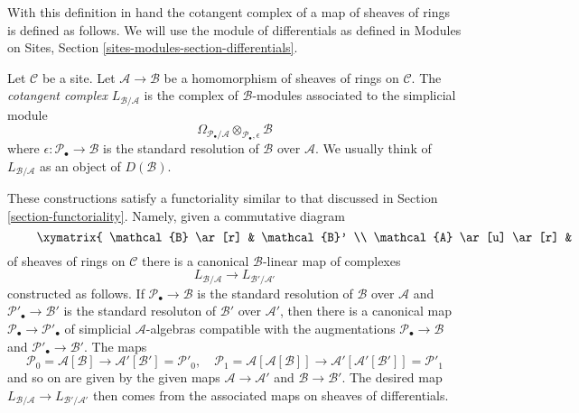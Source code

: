 \noindent
With this definition in hand the cotangent complex of a map of sheaves
of rings is defined as follows.
We will use the module of differentials as defined in
Modules on Sites, Section \ref{sites-modules-section-differentials}.

\begin{definition}
\label{definition-cotangent-complex-morphism-sheaves-rings}
Let $\mathcal{C}$ be a site.
Let $\mathcal{A} \to \mathcal{B}$ be a homomorphism of sheaves of rings
on $\mathcal{C}$.
The {\it cotangent complex} $L_{\mathcal{B}/\mathcal{A}}$
is the complex of $\mathcal{B}$-modules associated to the
simplicial module
$$
\Omega_{\mathcal{P}_\bullet/\mathcal{A}}
\otimes_{\mathcal{P}_\bullet, \epsilon} \mathcal{B}
$$
where $\epsilon : \mathcal{P}_\bullet \to \mathcal{B}$
is the standard resolution of $\mathcal{B}$ over
$\mathcal{A}$. We usually think of $L_{\mathcal{B}/\mathcal{A}}$
as an object of $D(\mathcal{B})$.
\end{definition}

\noindent
These constructions satisfy a functoriality similar to that discussed
in Section \ref{section-functoriality}. Namely, given a commutative diagram
\begin{equation}
\label{equation-commutative-square-sheaves}
\vcenter{
\xymatrix{
\mathcal{B} \ar[r] & \mathcal{B}' \\
\mathcal{A} \ar[u] \ar[r] & \mathcal{A}' \ar[u]
}
}
\end{equation}
of sheaves of rings on $\mathcal{C}$ there is a canonical
$\mathcal{B}$-linear map of complexes
$$
L_{\mathcal{B}/\mathcal{A}} \longrightarrow L_{\mathcal{B}'/\mathcal{A}'}
$$
constructed as follows. If $\mathcal{P}_\bullet \to \mathcal{B}$ is the
standard resolution of $\mathcal{B}$ over $\mathcal{A}$ and
$\mathcal{P}'_\bullet \to \mathcal{B}'$ is the
standard resoluton of $\mathcal{B}'$ over $\mathcal{A}'$,
then there is a canonical map $\mathcal{P}_\bullet \to \mathcal{P}'_\bullet$
of simplicial $\mathcal{A}$-algebras compatible with the augmentations
$\mathcal{P}_\bullet \to \mathcal{B}$ and
$\mathcal{P}'_\bullet \to \mathcal{B}'$. The maps
$$
\mathcal{P}_0 = \mathcal{A}[\mathcal{B}]
\longrightarrow
\mathcal{A}'[\mathcal{B}'] = \mathcal{P}'_0,
\quad
\mathcal{P}_1 = \mathcal{A}[\mathcal{A}[\mathcal{B}]]
\longrightarrow
\mathcal{A}'[\mathcal{A}'[\mathcal{B}']] = \mathcal{P}'_1
$$
and so on are given by the given maps $\mathcal{A} \to \mathcal{A}'$
and $\mathcal{B} \to \mathcal{B}'$. The desired map
$L_{\mathcal{B}/\mathcal{A}} \to L_{\mathcal{B}'/\mathcal{A}'}$
then comes from the associated maps on sheaves of differentials.

